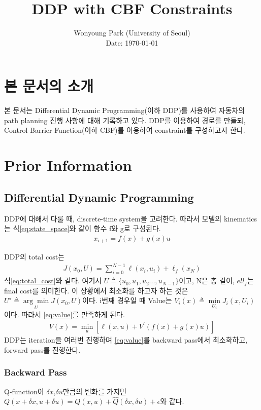 \documentclass[journal]{IEEEtran}
\begin{document}
\title{DDP with CBF Constraints}

\author{Wonyoung Park (University of Seoul)\\ 
        Date: \today
        }

\maketitle

\section{본 문서의 소개}
본 문서는 Differential Dynamic Programming(이하 DDP)를 사용하여 자동차의 path planning 진행 사항에 대해 기록하고 있다. DDP를 이용하여 경로를 만들되, Control Barrier Function(이하 CBF)를 이용하여 constraint를 구성하고자 한다. 

\section{Prior Information}
\subsection{Differential Dynamic Programming}
DDP에 대해서 다룰 때, discrete-time system을 고려한다. 따라서 모델의 kinematics는 식\eqref{eq:state_space}와 같이 함수 f와 g로 구성된다.
\begin{align}
	x_{i+1}=f(x)+g(x)u
	\label{eq:state_space}
\end{align}

DDP의 total cost는
\begin{align}
	J(x_0,U)=\sum_{i=0}^{N-1} \ell(x_i,u_i)+\ell_f(x_N)
	\label{eq:total_cost}
\end{align}
식\eqref{eq:total_cost}와 같다. 여기서 $U \triangleq \{u_0,u_1,u_2...,u_{N-1}\}$이고, N은 총 길이, $ell_f$는 final cost를 의미한다.
이 상황에서 최소화를 하고자 하는 것은 $U^{\star}\triangleq\underset{U}{\arg\min} J(x_0,U)$이다.
i번째 경우일 때 Value는 $V_i(x)\triangleq \underset{U_i}{\min}J_i(x,U_i)$이다. 따라서 \eqref{eq:value}를 만족하게 된다.
\begin{align}
	 V(x)=\underset{u}{\min}[\ell(x,u)+V^{\prime}(f(x)+g(x)u)]
	\label{eq:value}
\end{align}
DDP는 iteration을 여러번 진행하며 \eqref{eq:value}를 backward pass에서 최소화하고, forward pass를 진행한다.

\subsubsection{Backward Pass}
Q-function이 $\delta x$,$\delta u$만큼의 변화를 가지면 $Q(x+\delta x,u+\delta u)=Q(x,u)+\hat{Q}(\delta x,\delta u)+\epsilon$와 같다.
\end{document}
